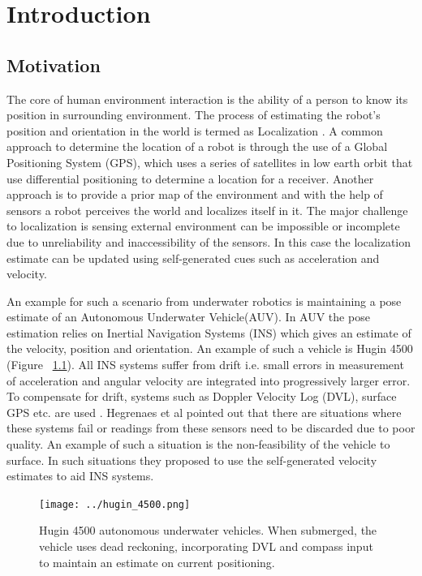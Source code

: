 \documentclass[12pt]{dalcsthesis}
\begin{document}
\mainmatter

\chapter{Introduction}
 





\section{Motivation}
The core of human environment interaction is the ability of a person to know its position in surrounding environment. The process of estimating the robot's position and orientation in the world is termed as Localization \cite{thrun2005probabilistic}.  A common approach to determine the location of a robot is through the use of a Global Positioning System (GPS), which uses a series of satellites in low earth orbit that use differential positioning to determine a location for a receiver.  Another approach is to provide a prior map of the environment and with the help of sensors a robot perceives the world and localizes itself in it. The major challenge to localization is sensing  external environment can be impossible or incomplete due to unreliability and inaccessibility of the sensors. In this case the localization estimate can be updated using self-generated cues such as acceleration and velocity.

An example for such a scenario from underwater robotics is maintaining a pose estimate of an Autonomous Underwater Vehicle(AUV). In AUV the pose estimation relies on Inertial Navigation Systems (INS) which gives an estimate of the velocity, position and orientation. An example of such a vehicle is Hugin 4500 (Figure ~\ref{fig-Hugin 4500}). All INS systems suffer from drift i.e. small errors in measurement of acceleration and angular velocity are integrated into progressively larger error.  To compensate for drift, systems such as Doppler Velocity Log (DVL), surface GPS etc. are used \cite{Lammas2004} \cite{leonard1998autonomous}. Hegrenaes et al \cite{Hegrenæs2008} pointed out that there are situations where these systems fail or readings from these sensors need to be discarded due to poor quality.  An example of such a situation is the non-feasibility of the vehicle to surface.  In such situations they proposed to use the self-generated velocity estimates to aid INS systems. 
\begin{figure}
  \centering
     {\texttt{[image: ../hugin\_4500.png]}}
  \caption{\label{fig-Hugin 4500} Hugin 4500 autonomous underwater vehicles. When submerged, the vehicle uses dead reckoning, incorporating DVL and compass input to maintain an estimate on current positioning.
}
\end{figure}
\end{document}
